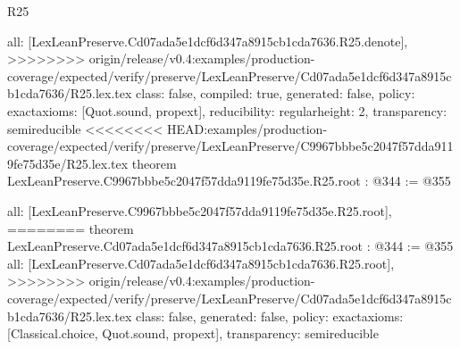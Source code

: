 \begin{lexlean}{R25}
\begin{coremodule}
{{{{{  all: [LexLeanPreserve.Cd07ada5e1dcf6d347a8915cb1cda7636.R25.denote],
>>>>>>>> origin/release/v0.4:examples/production-coverage/expected/verify/preserve/LexLeanPreserve/Cd07ada5e1dcf6d347a8915cb1cda7636/R25.lex.tex
  class: false,
  compiled: true,
  generated: false,
  policy: exact{axioms: [Quot.sound, propext]},
  reducibility: regular{height: 2},
  transparency: semireducible
}
<<<<<<<< HEAD:examples/production-coverage/expected/verify/preserve/LexLeanPreserve/C9967bbbe5c2047f57dda9119fe75d35e/R25.lex.tex
theorem LexLeanPreserve.C9967bbbe5c2047f57dda9119fe75d35e.R25.root : @344 := @355 {
  all: [LexLeanPreserve.C9967bbbe5c2047f57dda9119fe75d35e.R25.root],
========
theorem LexLeanPreserve.Cd07ada5e1dcf6d347a8915cb1cda7636.R25.root : @344 := @355 {
  all: [LexLeanPreserve.Cd07ada5e1dcf6d347a8915cb1cda7636.R25.root],
>>>>>>>> origin/release/v0.4:examples/production-coverage/expected/verify/preserve/LexLeanPreserve/Cd07ada5e1dcf6d347a8915cb1cda7636/R25.lex.tex
  class: false,
  generated: false,
  policy: exact{axioms: [Classical.choice, Quot.sound, propext]},
  transparency: semireducible
}

}}}}}
\end{coremodule}
\end{lexlean}
